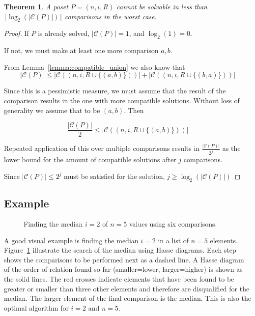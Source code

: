 \documentclass[10pt,journal,compsoc]{IEEEtran}
\newtheorem{theorem}{Theorem}
\begin{document}
\begin{theorem}\label{theorem:compatible_log}
  A poset $P=(n,i,R)$ cannot be solvable in less than $\lceil\log_2(|\mathcal{C}(P)|)\rceil$ comparisons in the worst case.
\end{theorem}

\begin{proof}
  If $P$ is already solved, $|\mathcal{C}(P)|=1$, and $\log_2(1)=0$.

  If not, we must make at least one more comparison $a, b$.

  From Lemma~\ref{lemma:compatible_union} we also know that
  $$|\mathcal{C}(P)| \leq |\mathcal{C}((n,i,R\cup \{(a, b)\}))| + |\mathcal{C}((n,i,R\cup \{(b, a)\}))|$$

  Since this is a pessimistic measure, we must assume that the result of the comparison results in the one with more compatible solutions.
  Without loss of generality we assume that to be $(a, b)$.
  Then

  $$\frac{|\mathcal{C}(P)|}{2}\leq |\mathcal{C}((n,i,R\cup \{(a, b)\}))|$$

  Repeated application of this over multiple comparisons results in $\frac{|\mathcal{C}(P)|}{2^j}$ as the lower bound for the amount of compatible solutions after $j$ comparisons.

  Since $|\mathcal{C}(P)|\leq 2^j$ must be satisfied for the solution, $j\geq\log_2(|\mathcal{C}(P)|)$
\end{proof}


\subsection{Example}
\begin{figure}[!b]
  \centering
  
  \caption{Finding the median $i = 2$ of $n = 5$ values using six comparisons.}
  \label{fig:median_of_5}
\end{figure}
A good visual example is finding the median $i=2$ in a list of $n = 5$ elements.
Figure~\ref{fig:median_of_5} illustrate the search of the median using Hasse diagrams.
Each step shows the comparisons to be performed next as a dashed line.
A Hasse diagram of the order of relation found so far (smaller=lower, larger=higher) is shown as the solid lines.
The red crosses indicate elements that have been found to be greater or smaller than three other elements and therefore are disqualified for the median.
The larger element of the final comparison is the median.
This is also the optimal algorithm for $i = 2$ and $n = 5$.
\end{document}
